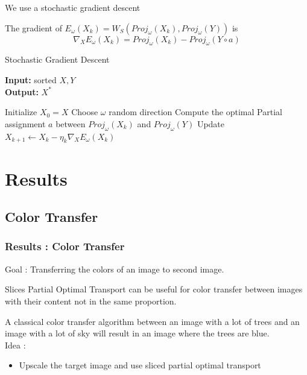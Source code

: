 \documentclass[11pt]{beamer}
\begin{document}
\begin{frame}
We use a {\color{red}stochastic gradient descent}

The gradient of $E_\omega(X_k) = W_S(Proj_\omega(X_k),Proj_\omega(Y))$ is 
\begin{equation}
\nabla_{X}  E_\omega(X_k) = Proj_\omega(X_k)-Proj_\omega(Y \circ a)
\end{equation}

\begin{algorithm}[H]
\caption{Stochastic Gradient Descent}\label{SGD}
\scriptsize
\hspace*{\algorithmicindent} \textbf{Input:} sorted $X,Y$\\
\hspace*{\algorithmicindent} \textbf{Output:} $X^*$ 
\begin{algorithmic}[2]
\State Initialize $X_0=X$
	\State Choose $\omega$ random direction
	\State Compute the optimal Partial assignment $a$ between $Proj_\omega(X_k)$ and $Proj_\omega(Y)$
	\State Update $X_{k+1} \gets X_k - \eta_k \nabla_{X}  E_\omega(X_k)$
\EndFor
\State {}
\end{algorithmic}
\end{algorithm}

\end{frame}

\section{Results}

\subsection{Color Transfer}

\begin{frame}
\frametitle{Results : Color Transfer}

Goal :
Transferring the colors of an image to second image.
\bigskip

Slices Partial Optimal Transport can be useful for color transfer {\color{red}between images with their content not in the same proportion}.
\bigskip

A classical color transfer algorithm between an image with a lot of trees and an image with a lot of sky will result in an image where the trees are blue. \\
\bigskip
Idea :
\begin{itemize}
\item {\color{red}Upscale} the target image and use sliced partial optimal transport
\end{itemize}
\end{frame}
\end{document}
